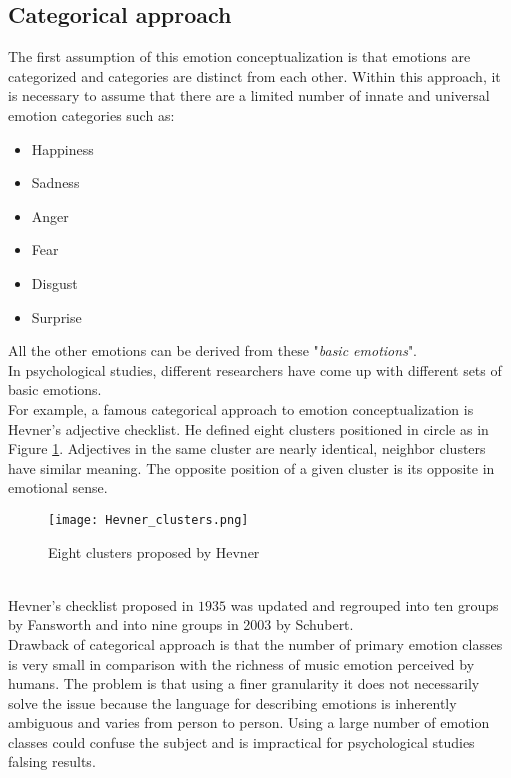 \subsection{Categorical approach} \label{categorical_approach}
The first assumption of this emotion conceptualization is that emotions are categorized and categories are distinct from each other. Within this approach, it is necessary to assume that there are a limited number of innate and universal emotion categories such as:
\begin{itemize}
	\item Happiness
	\item Sadness
	\item Anger
	\item Fear
	\item Disgust
	\item Surprise
\end{itemize}
All the other emotions can be derived from these "\textit{basic emotions}".
\\
In psychological studies, different researchers have come up with different sets of basic emotions.
\\
For example, a famous categorical approach to emotion conceptualization is Hevner's adjective checklist. He defined eight clusters positioned in circle as in Figure \ref{fig:Hevner_clusters}. Adjectives in the same cluster are nearly identical, neighbor clusters have similar meaning. The opposite position of a given cluster is its opposite in emotional sense.
\begin{figure}[h]
    \centering
    \texttt{[image: Hevner\_clusters.png]} 
	\caption{Eight clusters proposed by Hevner}
    \label{fig:Hevner_clusters}
\end{figure}
\\
Hevner's checklist proposed in $1935$ was updated and regrouped into ten groups by Fansworth and into nine groups in 2003 by Schubert.
\\ \indent
Drawback of categorical approach is that the number of primary emotion classes is very small in comparison with the richness of music emotion perceived by humans. The problem is that using a finer granularity it does not necessarily solve the issue because the language for describing emotions is inherently ambiguous and varies from person to person. Using a large number of emotion classes could confuse the subject and is impractical for psychological studies falsing results.

